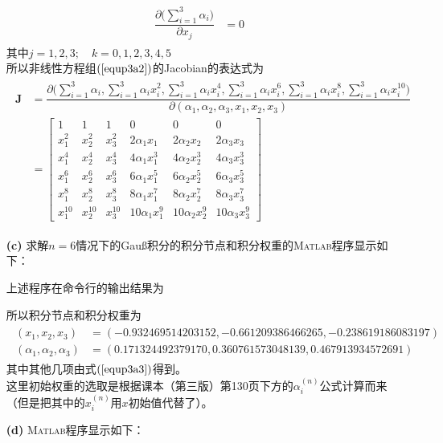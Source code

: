 \documentclass[12pt,a4paper,utf8]{ctexart}
\begin{document}
\begin{enumerate}
\begin{eqnarray}
\begin{aligned}
      \dfrac{\partial \Big(\sum\limits_{i=1}^{3}\alpha_{i}\Big)}{\partial x_j}&=0
      \end{aligned}
      \nonumber
   \end{eqnarray}
   其中$j=1,2,3;\quad k=0,1,2,3,4,5$\\
   所以非线性方程组$(\ref{equp3a2})$的Jacobian的表达式为
   \begin{eqnarray}
      \begin{aligned}
         \boldsymbol{J}&=\dfrac{\partial \Big(\sum\limits_{i=1}^{3}\alpha_{i},\sum\limits_{i=1}^{3}\alpha_{i} x_i^{2},
         \sum\limits_{i=1}^{3}\alpha_{i} x_i^{4},\sum\limits_{i=1}^{3}\alpha_{i} x_i^{6},
         \sum\limits_{i=1}^{3}\alpha_{i} x_i^{8},\sum\limits_{i=1}^{3}\alpha_{i} x_i^{10}\Big)}{
            \partial(\alpha_1,\alpha_2,\alpha_3,x_1,x_2,x_3)
         }\\
         &=\begin{bmatrix}
            1 & 1 & 1 & 0 & 0 & 0  \\
            x_1^2 & x_2^2 & x_3^2 & 2\alpha_1 x_1 & 2\alpha_2 x_2 & 2\alpha_3 x_3  \\
            x_1^4 & x_2^4 & x_3^4 & 4\alpha_1 x_1^3 & 4\alpha_2 x_2^3 & 4\alpha_3 x_3^3  \\
            x_1^6 & x_2^6 & x_3^6 & 6\alpha_1 x_1^5 & 6\alpha_2 x_2^5 & 6\alpha_3 x_3^5  \\
            x_1^8 & x_2^8 & x_3^8 & 8\alpha_1 x_1^7 & 8\alpha_2 x_2^7 & 8\alpha_3 x_3^7 \\
            x_1^{10} & x_2^{10} & x_3^{10} & 10\alpha_1 x_1^9 & 10\alpha_2 x_2^9 & 10\alpha_3 x_3^9 
         \end{bmatrix}
      \end{aligned}
   \end{eqnarray}
   \item[\textbf{(c)}] 求解$n = 6$情况下的Gauß积分的积分节点和积分权重的\textsc{Matlab}程序显示如下：
      
      上述程序在命令行的输出结果为
      
      所以积分节点和积分权重为
      \begin{eqnarray}
         \begin{aligned}
        (x_1,x_2,x_3)&=(-0.932469514203152,-0.661209386466265,-0.238619186083197)\\
        (\alpha_1,\alpha_2,\alpha_3)&=(0.171324492379170,0.360761573048139,0.467913934572691)
        \nonumber
         \end{aligned}
      \end{eqnarray}
      其中其他几项由式$(\ref{equp3a3})$得到。\\
      这里初始权重的选取是根据课本（第三版）第130页下方的$\alpha_i^{(n)}$公式计算而来（但是把其中的$x_i^{(n)}$用$x$初始值代替了）。
   \item[\textbf{(d)}]\textsc{Matlab}程序显示如下：
   
\end{enumerate}
\end{document}
